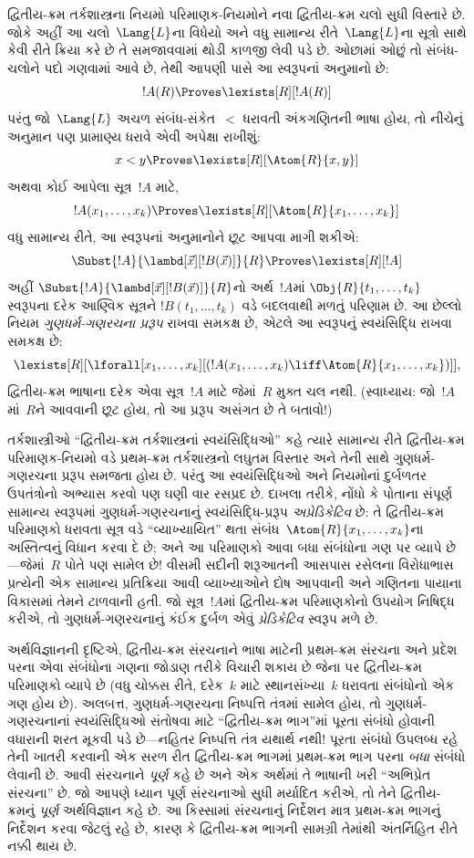 દ્વિતીય-ક્રમ તર્કશાસ્ત્રના નિયમો પરિમાણક-નિયમોને નવા દ્વિતીય-ક્રમ
ચલો સુધી વિસ્તારે છે. જોકે અહીં આ ચલો~$\Lang{L}$ના વિધેયો અને
વધુ સામાન્ય રીતે~$\Lang{L}$ના સૂત્રો સાથે કેવી રીતે ક્રિયા કરે
છે તે સમજાવવામાં થોડી કાળજી લેવી પડે છે. ઓછામાં ઓછું તો સંબંધ-ચલોને
પદો ગણવામાં આવે છે, તેથી આપણી પાસે આ સ્વરૂપનાં અનુમાનો છે:
\[
!A(R) \Proves \lexists[R][!A(R)]
\]
પરંતુ જો~$\Lang{L}$ અચળ સંબંધ-સંકેત~$<$ ધરાવતી અંકગણિતની ભાષા હોય,
તો નીચેનું અનુમાન પણ પ્રામાણ્ય ધરાવે એવી અપેક્ષા રાખીશું:
\[
x < y \Proves \lexists[R][\Atom{R}{x,y}]
\]
અથવા કોઈ આપેલા સૂત્ર~$!A$ માટે,
\[
!A(x_1, \dots, x_k) \Proves \lexists[R][\Atom{R}{x_1,\dots,x_k}]
\]
વધુ સામાન્ય રીતે, આ સ્વરૂપનાં અનુમાનોને છૂટ આપવા માગી શકીએ:
\[
\Subst{!A}{\lambd[\vec x][!B(\vec x)]}{R} \Proves
\lexists[R][!A]
\]
અહીં $\Subst{!A}{\lambd[\vec x][!B(\vec x)]}{R}$નો અર્થ~$!A$માં
$\Obj{R}{t_1,\dots,t_k}$ સ્વરૂપના દરેક આણ્વિક સૂત્રને
$!B(t_1, \dots, t_k)$ વડે બદલવાથી મળતું પરિણામ છે. આ છેલ્લો નિયમ
\emph{ગુણધર્મ-ગણરચના પ્રરૂપ} રાખવા સમકક્ષ છે, એટલે આ સ્વરૂપનું
સ્વયંસિદ્ધિ રાખવા સમકક્ષ છે:
\[
\lexists[R][\lforall[x_1, \dots, x_k][(!A(x_1, \dots, x_k) \liff
\Atom{R}{x_1, \dots, x_k})]],
\]
દ્વિતીય-ક્રમ ભાષાના દરેક એવા સૂત્ર~$!A$ માટે જેમાં~$R$ મુક્ત
ચલ નથી.
(સ્વાધ્યાય: જો~$!A$માં~$R$ને આવવાની છૂટ હોય, તો આ પ્રરૂપ અસંગત છે તે
બતાવો!)

તર્કશાસ્ત્રીઓ ``દ્વિતીય-ક્રમ તર્કશાસ્ત્રનાં સ્વયંસિદ્ધિઓ'' કહે ત્યારે
સામાન્ય રીતે દ્વિતીય-ક્રમ પરિમાણક-નિયમો વડે પ્રથમ-ક્રમ તર્કશાસ્ત્રનો
લઘુતમ વિસ્તાર અને તેની સાથે ગુણધર્મ-ગણરચના પ્રરૂપ સમજતા હોય છે. પરંતુ
આ સ્વયંસિદ્ધિઓ અને નિયમોનાં દુર્બળતર ઉપતંત્રોનો અભ્યાસ કરવો પણ ઘણી વાર
રસપ્રદ છે. દાખલા તરીકે, નોંધો કે પોતાના સંપૂર્ણ સામાન્ય સ્વરૂપમાં
ગુણધર્મ-ગણરચનાનું સ્વયંસિદ્ધિ-પ્રરૂપ \emph{અપ્રેડિકેટિવ} છે: તે
દ્વિતીય-ક્રમ પરિમાણકો ધરાવતા સૂત્ર વડે ``વ્યાખ્યાયિત'' થતા
સંબંધ~$\Atom{R}{x_1, \dots, x_k}$ના અસ્તિત્વનું વિધાન કરવા દે છે; અને
આ પરિમાણકો આવા બધા સંબંધોના ગણ પર વ્યાપે છે---જેમાં~$R$ પોતે પણ સામેલ
છે!{} વીસમી સદીની શરૂઆતની આસપાસ રસેલના વિરોધાભાસ પ્રત્યેની એક સામાન્ય
પ્રતિક્રિયા આવી વ્યાખ્યાઓને દોષ આપવાની અને ગણિતના પાયાના વિકાસમાં તેમને
ટાળવાની હતી. જો સૂત્ર~$!A$માં દ્વિતીય-ક્રમ પરિમાણકોનો ઉપયોગ
નિષિદ્ધ કરીએ, તો ગુણધર્મ-ગણરચનાનું કંઈક દુર્બળ એવું
\emph{પ્રેડિકેટિવ} સ્વરૂપ મળે છે.

અર્થવિજ્ઞાનની દૃષ્ટિએ, દ્વિતીય-ક્રમ સંરચનાને ભાષા માટેની
પ્રથમ-ક્રમ સંરચના અને પ્રદેશ પરના એવા સંબંધોના ગણના જોડાણ
તરીકે વિચારી શકાય છે જેના પર દ્વિતીય-ક્રમ પરિમાણકો વ્યાપે છે (વધુ
ચોક્કસ રીતે, દરેક~$k$ માટે સ્થાનસંખ્યા~$k$ ધરાવતા સંબંધોનો એક ગણ હોય
છે). અલબત્ત, ગુણધર્મ-ગણરચના નિષ્પત્તિ તંત્રમાં સામેલ હોય, તો
ગુણધર્મ-ગણરચનાનાં સ્વયંસિદ્ધિઓ સંતોષવા માટે ``દ્વિતીય-ક્રમ ભાગ''માં
પૂરતા સંબંધો હોવાની વધારાની શરત મૂકવી પડે છે---નહિતર નિષ્પત્તિ
તંત્ર યથાર્થ નથી!{} પૂરતા સંબંધો ઉપલબ્ધ રહે તેની ખાતરી કરવાની એક સરળ
રીત દ્વિતીય-ક્રમ ભાગમાં પ્રથમ-ક્રમ ભાગ પરના \emph{બધા} સંબંધો લેવાની
છે. આવી સંરચનાને \emph{પૂર્ણ} કહે છે અને એક અર્થમાં તે ભાષાની
ખરી ``અભિપ્રેત સંરચના'' છે. જો આપણે ધ્યાન પૂર્ણ સંરચનાઓ
સુધી મર્યાદિત કરીએ, તો તેને દ્વિતીય-ક્રમનું \emph{પૂર્ણ} અર્થવિજ્ઞાન
કહે છે. આ કિસ્સામાં સંરચનાનું નિર્દેશન માત્ર પ્રથમ-ક્રમ ભાગનું
નિર્દેશન કરવા જેટલું રહે છે, કારણ કે દ્વિતીય-ક્રમ ભાગની સામગ્રી તેમાંથી
અંતર્નિહિત રીતે નક્કી થાય છે.

